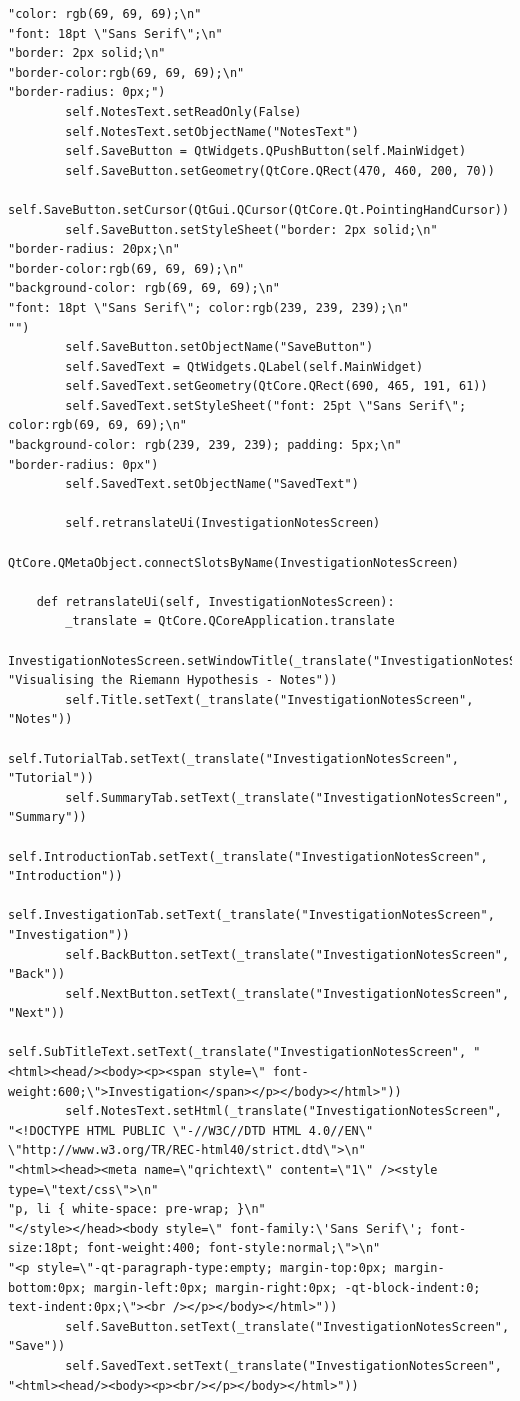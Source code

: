 \documentclass[12pt]{article}
\begin{document}
\begin{lstlisting}
"color: rgb(69, 69, 69);\n"
"font: 18pt \"Sans Serif\";\n"
"border: 2px solid;\n"
"border-color:rgb(69, 69, 69);\n"
"border-radius: 0px;")
        self.NotesText.setReadOnly(False)
        self.NotesText.setObjectName("NotesText")
        self.SaveButton = QtWidgets.QPushButton(self.MainWidget)
        self.SaveButton.setGeometry(QtCore.QRect(470, 460, 200, 70))
        self.SaveButton.setCursor(QtGui.QCursor(QtCore.Qt.PointingHandCursor))
        self.SaveButton.setStyleSheet("border: 2px solid;\n"
"border-radius: 20px;\n"
"border-color:rgb(69, 69, 69);\n"
"background-color: rgb(69, 69, 69);\n"
"font: 18pt \"Sans Serif\"; color:rgb(239, 239, 239);\n"
"")
        self.SaveButton.setObjectName("SaveButton")
        self.SavedText = QtWidgets.QLabel(self.MainWidget)
        self.SavedText.setGeometry(QtCore.QRect(690, 465, 191, 61))
        self.SavedText.setStyleSheet("font: 25pt \"Sans Serif\"; color:rgb(69, 69, 69);\n"
"background-color: rgb(239, 239, 239); padding: 5px;\n"
"border-radius: 0px")
        self.SavedText.setObjectName("SavedText")

        self.retranslateUi(InvestigationNotesScreen)
        QtCore.QMetaObject.connectSlotsByName(InvestigationNotesScreen)

    def retranslateUi(self, InvestigationNotesScreen):
        _translate = QtCore.QCoreApplication.translate
        InvestigationNotesScreen.setWindowTitle(_translate("InvestigationNotesScreen", "Visualising the Riemann Hypothesis - Notes"))
        self.Title.setText(_translate("InvestigationNotesScreen", "Notes"))
        self.TutorialTab.setText(_translate("InvestigationNotesScreen", "Tutorial"))
        self.SummaryTab.setText(_translate("InvestigationNotesScreen", "Summary"))
        self.IntroductionTab.setText(_translate("InvestigationNotesScreen", "Introduction"))
        self.InvestigationTab.setText(_translate("InvestigationNotesScreen", "Investigation"))
        self.BackButton.setText(_translate("InvestigationNotesScreen", "Back"))
        self.NextButton.setText(_translate("InvestigationNotesScreen", "Next"))
        self.SubTitleText.setText(_translate("InvestigationNotesScreen", "<html><head/><body><p><span style=\" font-weight:600;\">Investigation</span></p></body></html>"))
        self.NotesText.setHtml(_translate("InvestigationNotesScreen", "<!DOCTYPE HTML PUBLIC \"-//W3C//DTD HTML 4.0//EN\" \"http://www.w3.org/TR/REC-html40/strict.dtd\">\n"
"<html><head><meta name=\"qrichtext\" content=\"1\" /><style type=\"text/css\">\n"
"p, li { white-space: pre-wrap; }\n"
"</style></head><body style=\" font-family:\'Sans Serif\'; font-size:18pt; font-weight:400; font-style:normal;\">\n"
"<p style=\"-qt-paragraph-type:empty; margin-top:0px; margin-bottom:0px; margin-left:0px; margin-right:0px; -qt-block-indent:0; text-indent:0px;\"><br /></p></body></html>"))
        self.SaveButton.setText(_translate("InvestigationNotesScreen", "Save"))
        self.SavedText.setText(_translate("InvestigationNotesScreen", "<html><head/><body><p><br/></p></body></html>"))
\end{lstlisting}
\end{document}
